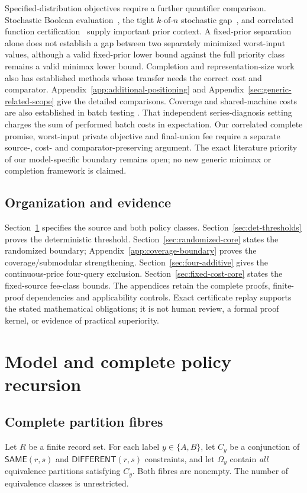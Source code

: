 \documentclass[pdflatex,sn-mathphys-num]{sn-jnl}
\newcommand{\SAME}{\mathsf{SAME}}
\newcommand{\DIFF}{\mathsf{DIFFERENT}}
\theoremstyle{thmstyleone}
\theoremstyle{thmstylethree}
\theoremstyle{thmstyletwo}
\begin{document}
Specified-distribution objectives require a further quantifier comparison.
Stochastic Boolean evaluation~\cite{hellerstein2022adaptivity}, the tight
$k$-of-$n$ stochastic gap~\cite{nielsen2025kofn}, and correlated function
certification~\cite{ghuge2026correlations} supply important prior context.
A fixed-prior separation alone does not establish a gap between two
separately minimized worst-input values, although a valid fixed-prior
lower bound against the full priority class remains a valid minimax
lower bound. Completion and representation-size work also has established
methods whose transfer needs the correct cost and comparator.
Appendix~\ref{app:additional-positioning} and
Appendix~\ref{sec:generic-related-scope} give the detailed comparisons.
Coverage and shared-machine costs are also established in batch testing
\cite{harris2025}. That independent series-diagnosis setting charges the
sum of performed batch costs in expectation. Our correlated complete
promise, worst-input private objective and final-union fee require a
separate source-, cost- and comparator-preserving argument.
The exact literature priority of our model-specific boundary remains open;
no new generic minimax or completion framework is claimed.

\subsection{Organization and evidence}
Section~\ref{sec:model-core} specifies the source and both policy classes.
Section~\ref{sec:det-thresholds} proves the deterministic threshold.
Section~\ref{sec:randomized-core} states the randomized boundary;
Appendix~\ref{app:coverage-boundary} proves the coverage/submodular strengthening.
Section~\ref{sec:four-additive} gives the continuous-price four-query
exclusion. Section~\ref{sec:fixed-cost-core} states the fixed-source
fee-class bounds. The appendices retain the complete proofs, finite-proof
dependencies and applicability controls. Exact certificate replay supports
the stated mathematical obligations; it is not human review, a formal
proof kernel, or evidence of practical superiority.

\section{Model and complete policy recursion}\label{sec:model-core}
\subsection{Complete partition fibres}
Let $R$ be a finite record set. For each label $y\in\{A,B\}$, let $C_y$ be a conjunction of $\SAME(r,s)$ and $\DIFF(r,s)$ constraints, and let $\Omega_y$ contain \emph{all} equivalence partitions satisfying $C_y$. Both fibres are nonempty. The number of equivalence classes is unrestricted.
\end{document}
